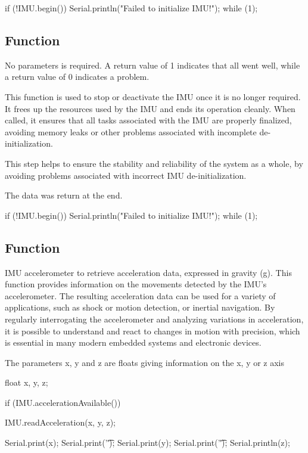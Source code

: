 \begin{Arduino}
	if (!IMU.begin()) {
		Serial.println("Failed to initialize IMU!");
		while (1);	}
\end{Arduino}


\subsection{Function } 

No parameters is required. A return value of 1 indicates that all went well, while a return value of 0 indicates a problem. \cite{arduino_lsm9ds1:2024}

This function is used to stop or deactivate the IMU once it is no longer required. It frees up the resources used by the IMU and ends its operation cleanly. When called, it ensures that all tasks associated with the IMU are properly finalized, avoiding memory leaks or other problems associated with incomplete de-initialization.

This step helps to ensure the stability and reliability of the system as a whole, by avoiding problems associated with incorrect IMU de-initialization.

The data was return at the end. 

\begin{Arduino}
	if (!IMU.begin()) {
		Serial.println("Failed to initialize IMU!");
		while (1); }
			
\end{Arduino}


\subsection{Function }

IMU accelerometer to retrieve acceleration data, expressed in gravity (g). This function provides information on the movements detected by the IMU's accelerometer. The resulting acceleration data can be used for a variety of applications, such as shock or motion detection, or inertial navigation. By regularly interrogating the accelerometer and analyzing variations in acceleration, it is possible to understand and react to changes in motion with precision, which is essential in many modern embedded systems and electronic devices. \cite{adafruit_lsm9ds1:2024}

The parameters x, y and z are floats giving information on the x, y or z axis 

\begin{Arduino}
	
	float x, y, z;
	
	if (IMU.accelerationAvailable()) {
		IMU.readAcceleration(x, y, z);
		
		Serial.print(x);
		Serial.print('\t');
		Serial.print(y);
		Serial.print('\t');
		Serial.println(z);	}
\end{Arduino}



